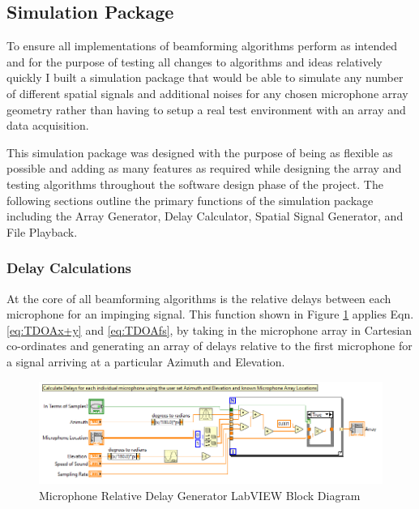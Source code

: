 \documentclass{UoNMCHA}
\numberwithin{equation}{section}
\begin{document}
\subsection{Simulation Package} \label{sec:Software Sim}
    
    To ensure all implementations of beamforming algorithms perform as intended and for the purpose of testing all changes to algorithms and ideas relatively quickly I built a simulation package that would be able to simulate any number of different spatial signals and additional noises for any chosen microphone array geometry rather than having to setup a real test environment with an array and data acquisition.
    
    This simulation package was designed with the purpose of being as flexible as possible and adding as many features as required while designing the array and testing algorithms throughout the software design phase of the project. The following sections outline the primary functions of the simulation package including the Array Generator, Delay Calculator, Spatial Signal Generator, and File Playback.
    
\subsubsection{Delay Calculations} \label{sec:Delay Calculations}
    At the core of all beamforming algorithms is the relative delays between each microphone for an impinging signal. This function shown in Figure \ref{fig:MicDelayBlock} applies Eqn. \ref{eq:TDOAx+y} and \ref{eq:TDOAfs}, by taking in the microphone array in Cartesian co-ordinates and generating an array of delays relative to the first microphone for a signal arriving at a particular Azimuth and Elevation.
    
    \begin{figure}[H]
        \centering
        \includegraphics[keepaspectratio, width = \textwidth]{Figures/DelayCalcBlock.png}
        \caption{Microphone Relative Delay Generator LabVIEW Block Diagram}
        \label{fig:MicDelayBlock}
    \end{figure}    
    
\end{document}
